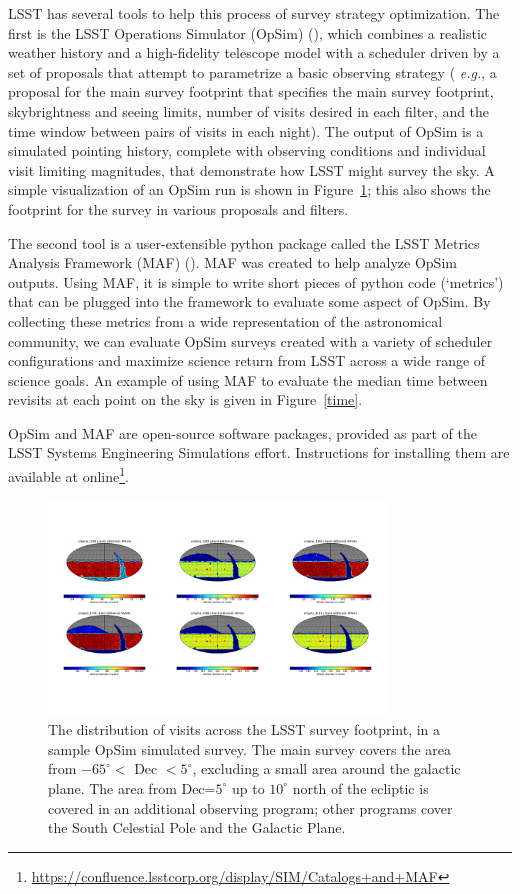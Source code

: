 \documentclass{iau}
\begin{document}
LSST has several tools to help this process of survey strategy
optimization. The first is the LSST Operations Simulator (OpSim)
(\cite{opsim}), which combines a realistic weather history and a
high-fidelity telescope model with a scheduler driven by a set of
proposals that attempt to parametrize a basic observing strategy ({\it
e.g.}, a proposal for the main survey footprint that specifies the
main survey footprint, skybrightness and seeing limits, number of
visits desired in each filter, and the time window between pairs of
visits in each night). The output of OpSim is a simulated pointing
history, complete with observing conditions and individual visit
limiting magnitudes, that demonstrate how LSST might survey the sky. A
simple visualization of an OpSim run is shown in
Figure~\ref{footprint}; this also shows the footprint for the
survey in various proposals and filters.

The second tool is a user-extensible python package called the LSST
Metrics Analysis Framework (MAF) (\cite{maf}). MAF was created to help
analyze OpSim outputs. Using MAF, it is simple to write short pieces
of python code (`metrics') that can be plugged into the framework to
evaluate some aspect of OpSim. By collecting these metrics from a wide
representation of the astronomical community, we can evaluate OpSim
surveys created with a variety of scheduler configurations and
maximize science return from LSST across a wide range of science
goals. An example of using MAF to evaluate the median time between
revisits at each point on the sky is given in Figure~\ref{time}.

OpSim and MAF are open-source software packages,
provided as part of the LSST Systems Engineering Simulations
effort. Instructions for installing them are available at
online\footnote{
\url{https://confluence.lsstcorp.org/display/SIM/Catalogs+and+MAF}}. 

\begin{figure}[tb]
\centering
\includegraphics[width=0.8\textwidth]{Nvisits}
\caption{The distribution of visits across the LSST survey footprint,
  in a sample OpSim simulated survey. The main survey covers the area
  from $-65^\circ<$ Dec $<5^\circ$, excluding a small area around the
  galactic plane. The area from Dec=$5^\circ$  up to $10^\circ$ north
  of the ecliptic is covered in an additional observing program; other
  programs cover the South Celestial Pole and the Galactic Plane.
\label{footprint}}
\end{figure}
\end{document}
